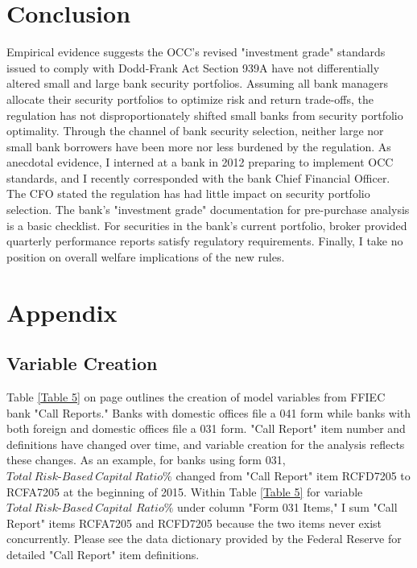 \documentclass[preprint,12pt]{elsarticle}
\begin{document}
\section{Conclusion}
Empirical evidence suggests the OCC's revised "investment grade" standards issued to comply with Dodd-Frank Act Section 939A have not differentially altered small and large bank security portfolios.  Assuming all bank managers allocate their security portfolios to optimize risk and return trade-offs, the regulation has not disproportionately shifted small banks from security portfolio optimality.  Through the channel of bank security selection, neither large nor small bank borrowers have been more nor less burdened by the regulation.  As anecdotal evidence, I interned at a bank in 2012 preparing to implement OCC standards, and I recently corresponded with the bank Chief Financial Officer.  The CFO stated the regulation has had little impact on security portfolio selection.  The bank's "investment grade" documentation for pre-purchase analysis is a basic checklist.  For securities in the bank's current portfolio, broker provided quarterly performance reports satisfy regulatory requirements.   Finally, I take no position on overall welfare implications of the new rules.  

\section{Appendix} 
\subsection{Variable Creation}
Table \ref{Table 5} on page \pageref{Table 5} outlines the creation of model variables from FFIEC bank "Call Reports."  Banks with domestic offices file a 041 form while banks with both foreign and domestic offices file a 031 form.  "Call Report" item number and definitions have changed over time, and variable creation for the analysis reflects these changes.  As an example, for banks using form 031, $Total \ Risk\textrm{-}Based \ Capital \ Ratio\%$ changed from "Call Report" item RCFD7205 to RCFA7205 at the beginning of 2015.  Within Table \ref{Table 5} for variable $Total \ Risk\textrm{-}Based \ Capital$ $Ratio\%$ under column "Form 031 Items," I sum "Call Report" items RCFA7205 and RCFD7205 because the two items never exist concurrently.  Please see the data dictionary provided by the Federal Reserve \citep{Reserve2018} for detailed "Call Report" item definitions.  
 
\end{document}
